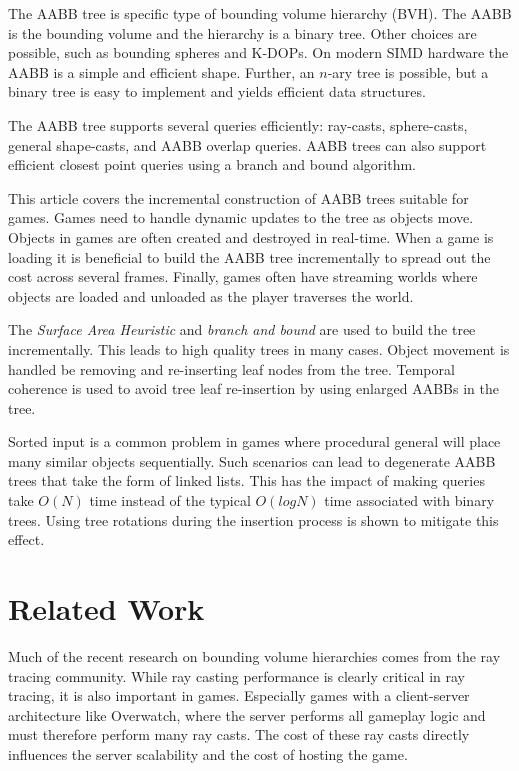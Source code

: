 \documentclass{article}
\begin{document}
The AABB tree is specific type of bounding volume hierarchy (BVH). The AABB is the bounding volume and the hierarchy is a binary tree. Other choices are possible, such as bounding spheres and K-DOPs. On modern SIMD hardware the AABB is a simple and efficient shape. Further, an $n$-ary tree is possible, but a binary tree is easy to implement and yields efficient data structures.

The AABB tree supports several queries efficiently: ray-casts, sphere-casts, general shape-casts, and AABB overlap queries. AABB trees can also support efficient closest point queries using a branch and bound algorithm.

This article covers the incremental construction of AABB trees suitable for games. Games need to handle dynamic updates to the tree as objects move. Objects in games are often created and destroyed in real-time. When a game is loading it is beneficial to build the AABB tree incrementally to spread out the cost across several frames. Finally, games often have streaming worlds where objects are loaded and unloaded as the player traverses the world.

The \emph{Surface Area Heuristic} and \emph{branch and bound} are used to build the tree incrementally. This leads to high quality trees in many cases. Object movement is handled be removing and re-inserting leaf nodes from the tree. Temporal coherence is used to avoid tree leaf re-insertion by using enlarged AABBs in the tree.

Sorted input is a common problem in games where procedural general will place many similar objects sequentially. Such scenarios can lead to degenerate AABB trees that take the form of linked lists. This has the impact of making queries take $O(N)$ time instead of the typical $O(log N)$ time associated with binary trees. Using tree rotations during the insertion process is shown to mitigate this effect.

\section{Related Work}
Much of the recent research on bounding volume hierarchies comes from the ray tracing community. While ray casting performance is clearly critical in ray tracing, it is also important in games. Especially games with a client-server architecture like Overwatch, where the server performs all gameplay logic and must therefore perform many ray casts. The cost of these ray casts directly influences the server scalability and the cost of hosting the game.
\end{document}
